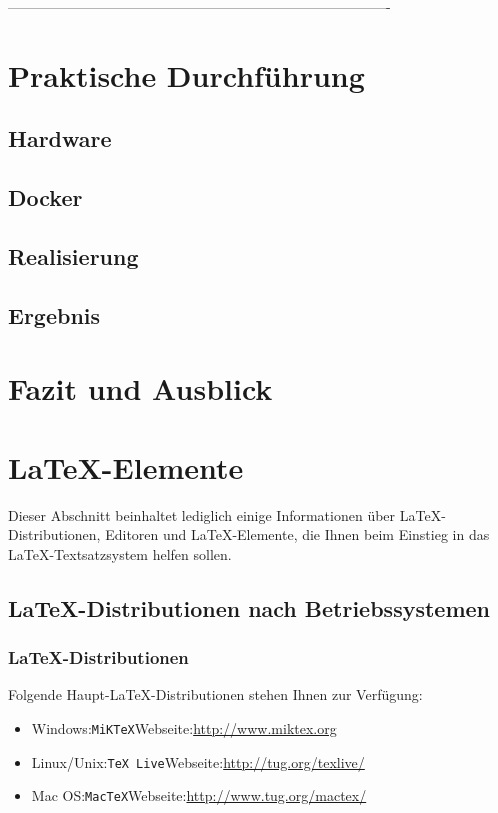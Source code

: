 \documentclass[12pt,a4paper,bibliography=totocnumbered,listof=totocnumbered]{scrartcl}
\begin{document}
 ----------------------------------------------------------------------------------
\section{Praktische Durchführung}
\subsection{Hardware}
\subsection{Docker}
\subsection{Realisierung}
\subsection{Ergebnis}


\pagebreak

\section{Fazit und Ausblick}



\pagebreak
\section{\LaTeX-Elemente}
Dieser Abschnitt beinhaltet lediglich einige Informationen über \LaTeX-Distributionen, Editoren und \LaTeX-Elemente, die Ihnen beim Einstieg in das \LaTeX-Textsatzsystem helfen sollen.

\subsection{\LaTeX-Distributionen nach Betriebssystemen}

\subsubsection{\LaTeX-Distributionen}
Folgende Haupt-\LaTeX-Distributionen stehen Ihnen zur Verfügung:
\begin{itemize}
  \item Windows:\quad \texttt{MiKTeX}\quad Webseite:\quad\url{http://www.miktex.org}
  \item Linux/Unix:\quad \texttt{TeX Live}\quad Webseite:\quad\url{http://tug.org/texlive/}
  \item Mac OS:\quad \texttt{MacTeX}\quad Webseite:\quad\url{http://www.tug.org/mactex/}
\end{itemize}
\end{document}
